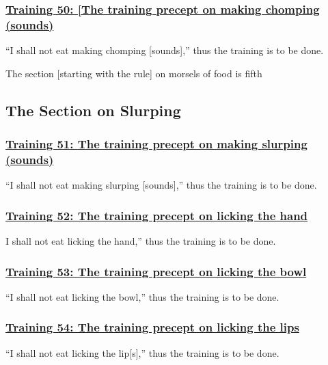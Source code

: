 \subsubsection*{\hyperref[sekh50]{Training 50: [The training precept on making chomping (sounds)}}
\label{training50}
``I shall not eat making chomping [sounds],'' thus the training is to be done.

\begin{center}
	The section [starting with the rule] on morsels of food is fifth
\end{center}



\setsubsecheadstyle{\subsectionFmt}
\subsection{The Section on Slurping}

\subsubsection*{\hyperref[sekh51]{Training 51: The training precept on making slurping (sounds)}}
\label{training51}
``I shall not eat making slurping [sounds],'' thus the training is to be done.



\subsubsection*{\hyperref[sekh52]{Training 52: The training precept on licking the hand}}
\label{training52}
I shall not eat licking the hand,'' thus the training is to be done.



\subsubsection*{\hyperref[sekh53]{Training 53: The training precept on licking the bowl}}
\label{training53}
``I shall not eat licking the bowl,'' thus the training is to be done.



\subsubsection*{\hyperref[sekh54]{Training 54: The training precept on licking the lips}}
\label{training54}
``I shall not eat licking the lip[s],'' thus the training is to be done.



